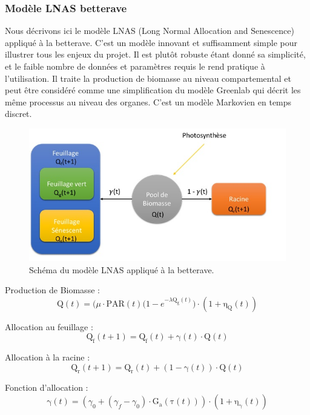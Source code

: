 \subsubsection{Modèle LNAS betterave}
Nous décrivons ici le modèle LNAS (Long Normal Allocation and Senescence) appliqué
à la betterave. C’est un modèle innovant et suffisamment simple pour illustrer tous les enjeux du projet. Il est plutôt robuste étant donné sa simplicité, et le faible nombre de données et paramètres requis le rend pratique à l’utilisation. Il traite la production de biomasse au niveau compartemental et peut être considéré comme une simplification du modèle Greenlab qui décrit les même processus au niveau des organes.
C’est un modèle Markovien en temps discret.
 
 \begin{figure}[h]
 	\begin{center}
 	
 	
   \includegraphics[scale=1.0]{./img/sBeetRoot.jpg}
   \caption{Schéma du modèle LNAS appliqué à la betterave.}
   \label{fig:sBeetRoot}
   
   \end{center}
 \end{figure}
 
Production de Biomasse :
 \[ \mathrm{Q}(t) = \big(\mu\cdot\mathrm{PAR}(t)(1-e^{-\lambda\mathrm{Q_g}(t)}\big)\cdot(1+\mathrm{\eta_Q}(t)) \]
 
Allocation au feuillage :
 \[ \mathrm{Q_f}(t+1) = \mathrm{Q_f}(t) + \mathrm{\gamma}(t)\cdot\mathrm{Q}(t) \]
 
Allocation à la racine :
 \[ \mathrm{Q_r}(t+1) = \mathrm{Q_r}(t) + (1 -\mathrm{\gamma}(t))\cdot\mathrm{Q}(t) \]
 
Fonction d'allocation :
 \[ \mathrm{\gamma}(t) = (\gamma_0 + (\gamma_f - \gamma_0)\cdot\mathrm{G_a}(\mathrm{\tau}(t)))\cdot(1+\mathrm{\eta_{\gamma}}(t)) \]
 

